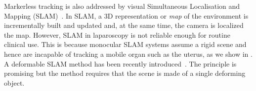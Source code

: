 Markerless tracking is also addressed by visual Simultaneous Localisation and Mapping (SLAM)~\cite{Thrun2002Robotic,Mahmoud2017}. 
In SLAM,  a 3D representation or \textit{map} of the environment is incrementally built and updated and, at the same time, the camera is localized \wrt the map.
However, SLAM in laparoscopy is not reliable enough for routine clinical use. %
This is because monocular SLAM systems assume a rigid scene and hence are incapable of tracking a mobile organ such as the uterus, as we show in .
A deformable SLAM method has been recently introduced~\cite{Lamarca2019}. 
The principle is promising but the method requires that the scene is made of a single deforming object. 

